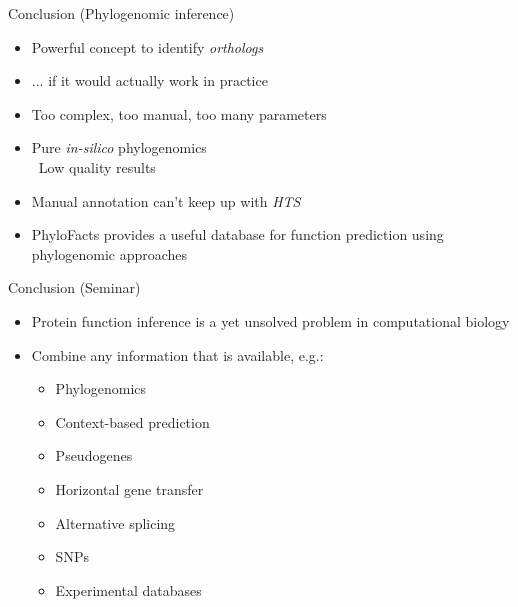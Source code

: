 \documentclass[14pt,xcolor=dvipsnames,pdftex]{beamer}
\begin{document}
\begin{frame}{Conclusion (Phylogenomic inference)}
 \begin{itemize}
  \item Powerful concept to identify \textit{orthologs}
  \pause
  \item ... if it would actually work in practice
  \item Too complex, too manual, too many parameters
  \item Pure \textit{in-silico} phylogenomics\\
  \textrightarrow\ Low quality results
  \item Manual annotation can't keep up with \textit{HTS}
  \item PhyloFacts provides a useful database for function prediction using phylogenomic approaches
 \end{itemize}
\end{frame}

\begin{frame}{Conclusion (Seminar)}
\begin{itemize}
\item Protein function inference is a yet unsolved problem in computational biology
\item Combine any information that is available, e.g.:
\begin{itemize}
 \item Phylogenomics
 \item Context-based prediction
 \item Pseudogenes
 \item Horizontal gene transfer
 \item Alternative splicing
 \item SNPs
 \item Experimental databases
\end{itemize}

\end{itemize}
\end{frame}
\end{document}
